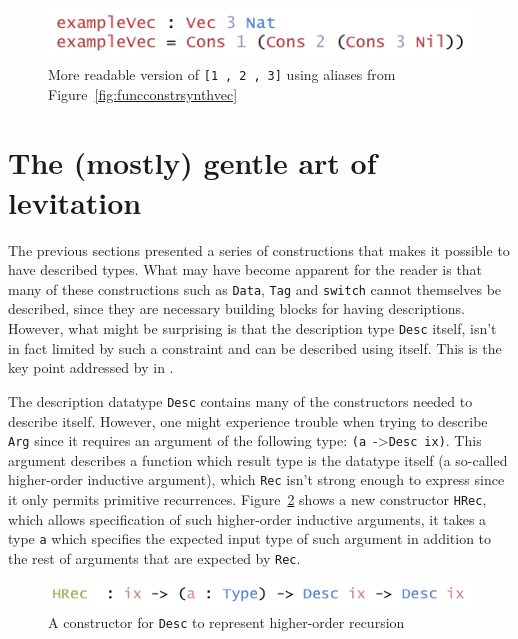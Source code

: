 \documentclass{ituthesis}
\newcommand{\ttconstructor}[1]{\textcolor{constructor-color}{\texttt{#1}}}
\newcommand{\tttype}[1]{\textcolor{type-color}{\texttt{#1}}}
\newcommand{\ttdec}[1]{\textcolor{declared-var-color}{\texttt{#1}}}
\newcommand{\ttvar}[1]{\textcolor{local-var-color}{\texttt{#1}}}
\newcommand{\ttliteral}[1]{\textcolor{literal-color}{\texttt{#1}}}
\theoremstyle{break}
\begin{document}
\begin{figure}[ht]
\begin{center}
    \includegraphics[scale=0.5]{Figures/VectorSynthesisedConstructorsExample.png}
\end{center}
\caption{More readable version of \ttconstructor{[}\ttliteral{1}~\ttconstructor{,}~\ttliteral{2}~\ttconstructor{,}~\ttliteral{3}\ttconstructor{]} using aliases from Figure~\ref{fig:funcconstrsynthvec}}
\label{fig:exmvecsynthvecdescconstrs}
\end{figure}

\section{The (mostly) gentle art of levitation}
\label{sec:TheMostlyGentleArtofLevitation}
The previous sections presented a series of constructions that makes it possible to have described types.
What may have become apparent for the reader is that many of these constructions such as \tttype{Data}, \tttype{Tag} and \ttdec{switch} cannot themselves be described,
since they are necessary building blocks for having descriptions.
However, what might be surprising is that the description type \tttype{Desc} itself, isn't in fact limited by such a constraint
and can be described using itself.
This is the key point addressed by \textcite{Chapman:2010:GAL:1863543.1863547} in .

The description datatype \tttype{Desc} contains many of the constructors needed to describe itself.
However, one might experience trouble when trying to describe \ttconstructor{Arg} since it requires an argument of the following type:
\texttt{(}\ttvar{a}~->\tttype{Desc}~\ttvar{ix}\texttt{)}.
This argument describes a function which result type is the datatype itself (a so-called higher-order inductive argument), which \ttconstructor{Rec} isn't strong enough to express since it only permits primitive recurrences.
Figure~\ref{fig:deschrec} shows a new constructor \ttconstructor{HRec}, which allows specification of such higher-order inductive arguments, it takes a type \ttvar{a} which specifies
the expected input type of such argument in addition to the rest of arguments that are expected by \ttconstructor{Rec}.

\begin{figure}[ht]
\begin{center}
    \includegraphics[scale=0.5]{Figures/ADescriptionForDatatypesExtended.png}
\end{center}
\caption{A constructor for \tttype{Desc} to represent higher-order recursion}
\label{fig:deschrec}
\end{figure}
\end{document}
